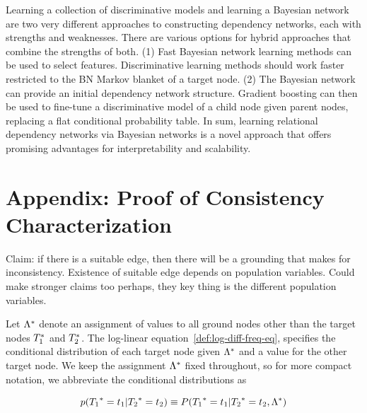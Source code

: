 \documentclass[runningheads,a4paper]{llncs}
\begin{document}
Learning a collection of discriminative models and learning a Bayesian network are two very different approaches to constructing dependency networks, each with strengths and weaknesses. There are various options for hybrid approaches that combine the strengths of both. (1) Fast Bayesian network learning methods can be used to select features. Discriminative learning methods should work  faster restricted to the BN Markov blanket of a target node. (2) The Bayesian network can provide an initial dependency network structure. Gradient boosting can then be used to fine-tune a discriminative model of a child node given parent nodes, replacing a flat conditional probability table. In sum, learning relational dependency networks via Bayesian networks is a novel approach that offers promising advantages for  interpretability and scalability.


\section*{Appendix: Proof of Consistency Characterization} 

Claim: if there is a suitable edge, then there will be a grounding that makes for inconsistency.  Existence of suitable edge depends on population variables. Could make stronger claims too perhaps, they key thing is the different population variables. 


Let $\Lambda^{*}\hspace{0.0ex}$ denote an assignment of values to all ground nodes other than the target nodes $T_{1}^{*}\hspace{0.0ex}$ and $ T_{2}^{*}\hspace{0.0ex}$. The log-linear equation~\ref{def:log-diff-freq-eq}, specifies the conditional distribution of each target node given $\Lambda^{*}\hspace{0.0ex}$ and a value for the other target node. We keep the assignment $\Lambda^{*}\hspace{0.0ex}$ fixed throughout, so for more compact notation, we abbreviate the conditional distributions as

$$p({T_{1}}^{*}\hspace{0.0ex} = t_{1}| {T_{2}}^{*}\hspace{0.0ex} = t_{2}) \equiv P({T_{1}}^{*}\hspace{0.0ex} = t_{1}|{T_{2}}^{*}\hspace{0.0ex} = t_{2},\Lambda^{*}\hspace{0.0ex})$$ 
\end{document}
